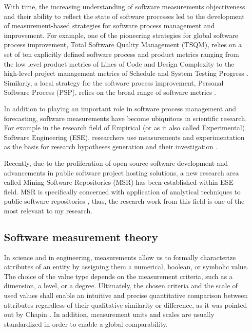 With time, the increasing understanding of software measurements objectiveness and their ability to reflect 
the state of software processes led to the development of measurement-based strategies for software 
process management and improvement. 
For example, one of the pioneering strategies for global software process improvement, 
Total Software Quality Management (TSQM), relies on a set of ten explicitly defined software 
process and product metrics ranging from the low level product metrics of Lines of Code and Design Complexity to 
the high-level project management metrics of Schedule and System Testing Progress \cite{citeulike:13071448}.
Similarly, a local strategy for the software process improvement, Personal Software Process (PSP), relies on 
the broad range of software metrics \cite{citeulike:13072239}.

In addition to playing an important role in software process management and forecasting, software 
measurements have become ubiquitous in scientific research. 
For example in the research field of Empirical (or as it also called Experimental) Software Engineering (ESE), 
researchers use measurements and experimentation as the basis for research hypotheses 
generation and their investigation \cite{citeulike:766768}. 

Recently, due to the proliferation of open source software development and advancements in public software
project hosting solutions, a new research area called Mining Software Repositories (MSR) has been established 
within ESE field. MSR is specifically concerned with application of analytical techniques to public software 
repositories \cite{citeulike:12550438} \cite{citeulike:4534888} \cite{citeulike:2710928}, thus, 
the research work from this field is one of the most relevant to my research.

\subsection{Software measurement theory}
In science and in engineering, measurements allow us to formally characterize attributes of an entity by assigning 
them a numerical, boolean, or symbolic value. 
The choice of the value type depends on the measurement criteria, such as a dimension, a level, 
or a degree. Ultimately, the chosen criteria and the scale of used values shall enable an intuitive 
and precise quantitative comparison between attributes regardless of their qualitative similarity or 
difference, as it was pointed out by Chapin \cite{citeulike:13158806}. 
In addition, measurement units and scales are usually standardized in order to enable a global comparability.

